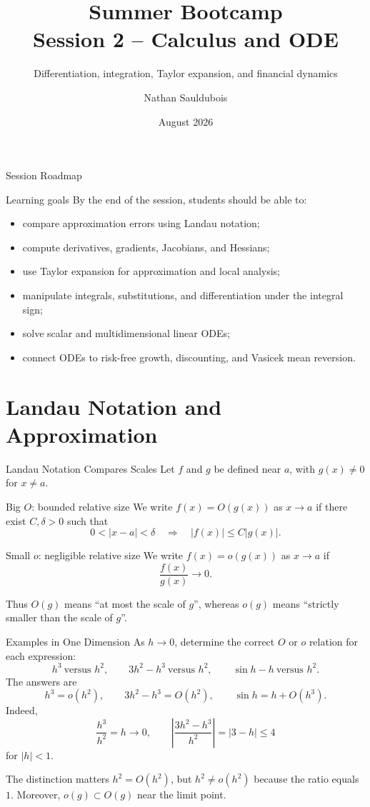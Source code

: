 \documentclass[aspectratio=169]{beamer}
\title[Session 2 -- Calculus and ODE]{Summer Bootcamp\\Session 2 -- Calculus and ODE}
\subtitle{Differentiation, integration, Taylor expansion, and financial dynamics}
\author{Nathan Sauldubois}
\institute{NYU Finance and Risk Engineering}
\date{August 2026}
\begin{document}
\begin{frame}
  \titlepage
\end{frame}

\begin{frame}{Session Roadmap}
\begin{block}{Learning goals}
By the end of the session, students should be able to:
\begin{itemize}
  \item compare approximation errors using Landau notation;
  \item compute derivatives, gradients, Jacobians, and Hessians;
  \item use Taylor expansion for approximation and local analysis;
  \item manipulate integrals, substitutions, and differentiation under the integral sign;
  \item solve scalar and multidimensional linear ODEs;
  \item connect ODEs to risk-free growth, discounting, and Vasicek mean reversion.
\end{itemize}
\end{block}
\end{frame}

\section{Landau Notation and Approximation}

\begin{frame}{Landau Notation Compares Scales}
Let $f$ and $g$ be defined near $a$, with $g(x)\neq0$ for $x\neq a$.
\begin{block}{Big $O$: bounded relative size}
We write $f(x)=O(g(x))$ as $x\to a$ if there exist $C,\delta>0$ such that
\[
0<|x-a|<\delta
\quad\Longrightarrow\quad
|f(x)|\leq C|g(x)|.
\]
\end{block}
\pause
\begin{block}{Small $o$: negligible relative size}
We write $f(x)=o(g(x))$ as $x\to a$ if
\[
\frac{f(x)}{g(x)}\longrightarrow0.
\]
\end{block}
Thus $O(g)$ means ``at most the scale of $g$'', whereas $o(g)$ means
``strictly smaller than the scale of $g$''.
\end{frame}

\begin{frame}{Examples in One Dimension}
As $h\to0$, determine the correct $O$ or $o$ relation for each expression:
\[
h^3\ \text{versus }h^2,
\qquad 3h^2-h^3\ \text{versus }h^2,
\qquad \sin h-h\ \text{versus }h^2.
\]
\pause
The answers are
\[
h^3=o(h^2),
\qquad
3h^2-h^3=O(h^2),
\qquad
\sin h=h+O(h^3).
\]
\pause
Indeed,
\[
\frac{h^3}{h^2}=h\to0,
\qquad
\left|\frac{3h^2-h^3}{h^2}\right|=|3-h|\leq4
\]
for $|h|<1$.
\pause
\begin{alertblock}{The distinction matters}
$h^2=O(h^2)$, but $h^2\neq o(h^2)$ because the ratio equals $1$.
Moreover, $o(g)\subset O(g)$ near the limit point.
\end{alertblock}
\end{frame}
\end{document}
